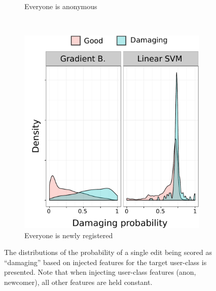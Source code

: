 \begin{figure}[h]
\begin{subfigure}[t]{.33\textwidth}
  \caption{Everyone is anonymous}
  \label{fig:anon_damaging_gb_bs_svc}
\end{subfigure}~~
\begin{subfigure}[t]{.33\textwidth}
  \centering
  \includegraphics[width=.95\textwidth]{figures/newcomer_damaging_gb_vs_svc}
  \caption{Everyone is newly registered}
  \label{fig:newcomer_damaging_gb_bs_svc}
\end{subfigure}
\caption{The distributions of the probability of a single edit being scored as ``damaging'' based on injected features for the target user-class is presented.  Note that when injecting user-class features (anon, newcomer), all other features are held constant.}
\label{fig:prediction_error_for_anons_and_newcomers}
\end{figure}
